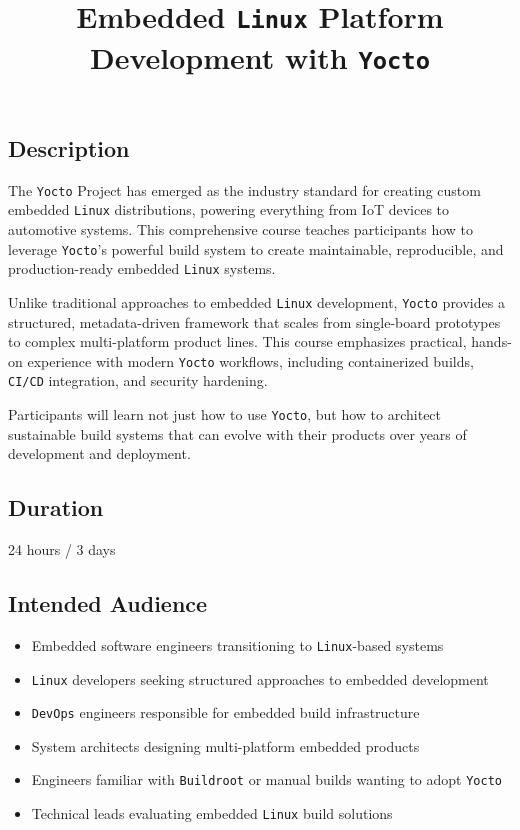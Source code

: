 \documentclass[
]{article}
\title{Embedded \texttt{Linux} Platform Development with \texttt{Yocto}}
\author{}
\date{}
\providecommand{\tightlist}{%
  \setlength{\itemsep}{0pt}\setlength{\parskip}{0pt}}
\begin{document}
\maketitle

\subsection{Description}\label{description}

The \texttt{Yocto} Project has emerged as the industry standard for
creating custom embedded \texttt{Linux} distributions, powering
everything from IoT devices to automotive systems. This comprehensive
course teaches participants how to leverage \texttt{Yocto}'s powerful
build system to create maintainable, reproducible, and production-ready
embedded \texttt{Linux} systems.

Unlike traditional approaches to embedded \texttt{Linux} development,
\texttt{Yocto} provides a structured, metadata-driven framework that
scales from single-board prototypes to complex multi-platform product
lines. This course emphasizes practical, hands-on experience with modern
\texttt{Yocto} workflows, including containerized builds, \texttt{CI/CD}
integration, and security hardening.

Participants will learn not just how to use \texttt{Yocto}, but how to
architect sustainable build systems that can evolve with their products
over years of development and deployment.

\subsection{Duration}\label{duration}

24 hours / 3 days

\subsection{Intended Audience}\label{intended-audience}

\begin{itemize}
\tightlist
\item
  Embedded software engineers transitioning to \texttt{Linux}-based
  systems
\item
  \texttt{Linux} developers seeking structured approaches to embedded
  development
\item
  \texttt{DevOps} engineers responsible for embedded build
  infrastructure
\item
  System architects designing multi-platform embedded products
\item
  Engineers familiar with \texttt{Buildroot} or manual builds wanting to
  adopt \texttt{Yocto}
\item
  Technical leads evaluating embedded \texttt{Linux} build solutions
\end{itemize}
\end{document}
